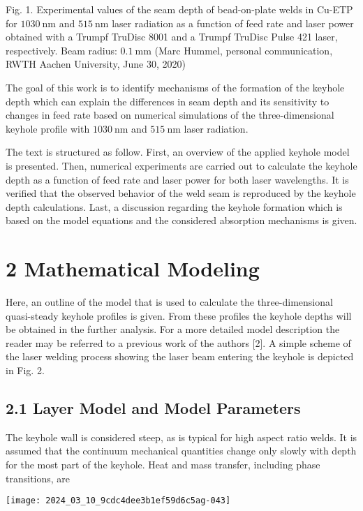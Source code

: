 \documentclass[10pt]{article}
\begin{document}
Fig. 1. Experimental values of the seam depth of bead-on-plate welds in Cu-ETP for $1030 \mathrm{~nm}$ and $515 \mathrm{~nm}$ laser radiation as a function of feed rate and laser power obtained with a Trumpf TruDisc 8001 and a Trumpf TruDisc Pulse 421 laser, respectively. Beam radius: $0.1 \mathrm{~mm}$ (Marc Hummel, personal communication, RWTH Aachen University, June 30, 2020)

The goal of this work is to identify mechanisms of the formation of the keyhole depth which can explain the differences in seam depth and its sensitivity to changes in feed rate based on numerical simulations of the three-dimensional keyhole profile with $1030 \mathrm{~nm}$ and $515 \mathrm{~nm}$ laser radiation.

The text is structured as follow. First, an overview of the applied keyhole model is presented. Then, numerical experiments are carried out to calculate the keyhole depth as a function of feed rate and laser power for both laser wavelengths. It is verified that the observed behavior of the weld seam is reproduced by the keyhole depth calculations. Last, a discussion regarding the keyhole formation which is based on the model equations and the considered absorption mechanisms is given.

\section*{2 Mathematical Modeling}
Here, an outline of the model that is used to calculate the three-dimensional quasi-steady keyhole profiles is given. From these profiles the keyhole depths will be obtained in the further analysis. For a more detailed model description the reader may be referred to a previous work of the authors [2]. A simple scheme of the laser welding process showing the laser beam entering the keyhole is depicted in Fig. 2.

\subsection*{2.1 Layer Model and Model Parameters}
The keyhole wall is considered steep, as is typical for high aspect ratio welds. It is assumed that the continuum mechanical quantities change only slowly with depth for the most part of the keyhole. Heat and mass transfer, including phase transitions, are

\begin{center}
\texttt{[image: 2024\_03\_10\_9cdc4dee3b1ef59d6c5ag-043]}
\end{center}
\end{document}

